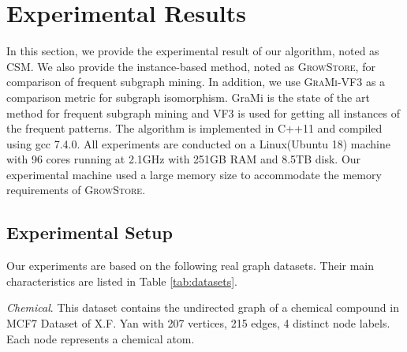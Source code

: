 \section{Experimental Results}
\label{sec:experiments}

In this section, we provide the experimental result of our algorithm, noted as \textsc {CSM}. We also provide the instance-based method, noted as \textsc {GrowStore}, for comparison of frequent subgraph mining. In addition, we use \textsc {GraMi-VF3} as a comparison metric for subgraph isomorphism. GraMi is the state of the art method for frequent subgraph mining and VF3 is used for getting all instances of the frequent patterns. The algorithm is implemented in C++11 and compiled using gcc 7.4.0. All experiments are conducted on a Linux(Ubuntu 18) machine with 96 cores running at 2.1GHz with 251GB RAM and 8.5TB disk. Our experimental machine used a large memory size to accommodate the memory requirements of \textsc{GrowStore}.




\subsection{Experimental Setup}

 Our experiments are based on the following real graph datasets. Their main characteristics are listed in Table \ref{tab:datasets}.


\par{\textit{Chemical}}. This dataset contains the undirected graph of a chemical compound in MCF7 Dataset of X.F. Yan\cite{YH02} with 207 vertices, 215 edges, 4 distinct node labels. Each node represents a chemical atom.

